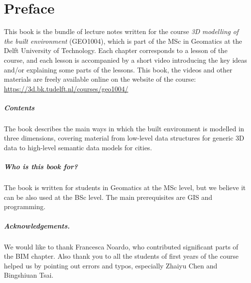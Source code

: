 


\chapter*{Preface}

This book is the bundle of lecture notes written for the course \emph{3D modelling of the built environment} (GEO1004), which is part of the MSc in Geomatics at the Delft University of Technology.
Each chapter corresponds to a lesson of the course, and each lesson is accompanied by a short video introducing the key ideas and/or explaining some parts of the lessons.
This book, the videos and other materials are freely available online on the website of the course: \url{https://3d.bk.tudelft.nl/courses/geo1004/}

\paragraph*{Contents}
The book describes the main ways in which the built environment is modelled in three dimensions, covering material from low-level data structures for generic 3D data to high-level semantic data models for cities.

\paragraph*{Who is this book for?}
The book is written for students in Geomatics at the MSc level, but we believe it can be also used at the BSc level.
The main prerequisites are GIS and programming.

\paragraph*{Acknowledgements.}
We would like to thank Francesca Noardo, who contributed significant parts of the BIM chapter.
Also thank you to all the students of first years of the course helped us by pointing out errors and typos, especially Zhaiyu Chen and Bingshiuan Tsai.




